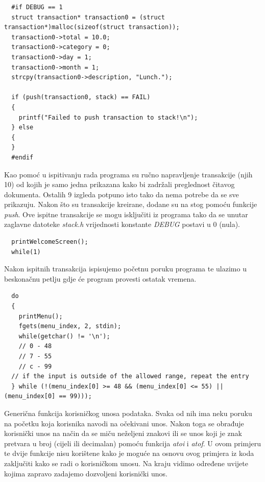 \documentclass[12pt, letterpaper]{article}
\begin{document}
  \begin{verbatim}
  #if DEBUG == 1
  struct transaction* transaction0 = (struct transaction*)malloc(sizeof(struct transaction));
  transaction0->total = 10.0;
  transaction0->category = 0;
  transaction0->day = 1;
  transaction0->month = 1;
  strcpy(transaction0->description, "Lunch.");

  if (push(transaction0, stack) == FAIL)
  {
    printf("Failed to push transaction to stack!\n");
  } else
  {
  }
  #endif
  \end{verbatim}
  Kao pomoć u ispitivanju rada programa su ručno napravljenje transakcije (njih 10) od kojih je samo jedna prikazana kako bi zadržali preglednost čitavog dokumenta. Ostalih 9 izgleda potpuno isto tako da nema potrebe da se sve prikazuju. Nakon što su transakcije kreirane, dodane su na stog pomoću funkcije \textit{push}. Ove ispitne transakcije se mogu isključiti iz programa tako da se unutar zaglavne datoteke \textit{stack.h} vrijednosti konstante \textit{DEBUG} postavi u 0 (nula).


  \begin{verbatim}
  printWelcomeScreen();
  while(1)
  \end{verbatim}
  Nakon ispitnih transakcija ispisujemo početnu poruku programa te ulazimo u beskonačnu petlju gdje će program provesti ostatak vremena.
  \begin{verbatim}
  do
  {
    printMenu();
    fgets(menu_index, 2, stdin);
    while(getchar() != '\n');
    // 0 - 48
    // 7 - 55
    // c - 99
  // if the input is outside of the allowed range, repeat the entry
  } while (!(menu_index[0] >= 48 && (menu_index[0] <= 55) || (menu_index[0] == 99)));
  \end{verbatim}
  Generična funkcija korisničkog unosa podataka. Svaka od nih ima neku poruku na početku koja korisnika navodi na očekivani unos. Nakon toga se obrađuje korisnički unos na način da se miču neželjeni znakovi ili se unos koji je znak pretvara u broj (cijeli ili decimalan) pomoću funkcija \textit{atoi} i \textit{atof}. U ovom primjeru te dvije funkcije nisu korištene kako je moguće na osnovu ovog primjera iz koda zaključiti kako se radi o korisničkom unosu. Na kraju vidimo određene uvijete kojima zapravo zadajemo dozvoljeni korisnički unos.
  
\end{document}
